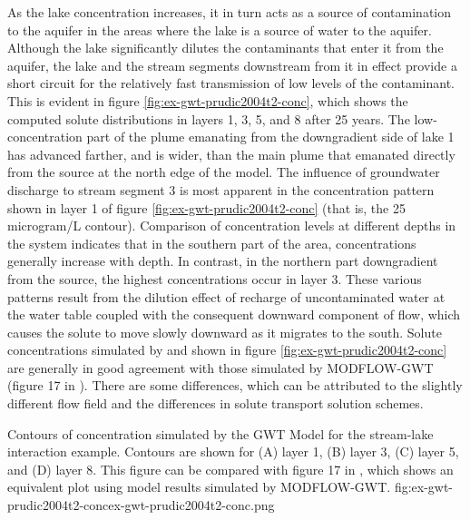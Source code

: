 As the lake concentration increases, it in turn acts as a source of contamination to the aquifer in the areas where the lake is a source of water to the aquifer. Although the lake significantly dilutes the contaminants that enter it from the aquifer, the lake and the stream segments downstream from it in effect provide a short circuit for the relatively fast transmission of low levels of the contaminant. This is evident in figure \ref{fig:ex-gwt-prudic2004t2-conc}, which shows the computed solute distributions in layers 1, 3, 5, and 8 after 25 years. The low-concentration part of the plume emanating from the downgradient side of lake 1 has advanced farther, and is wider, than the main plume that emanated directly from the source at the north edge of the model. The influence of groundwater discharge to stream segment 3 is most apparent in the concentration pattern shown in layer 1 of figure \ref{fig:ex-gwt-prudic2004t2-conc} (that is, the 25 microgram/L contour). Comparison of concentration levels at different depths in the system indicates that in the southern part of the area, concentrations generally increase with depth. In contrast, in the northern part downgradient from the source, the highest concentrations occur in layer 3. These various patterns result from the dilution effect of recharge of uncontaminated water at the water table coupled with the consequent downward component of flow, which causes the solute to move slowly downward as it migrates to the south.  Solute concentrations simulated by \mf and shown in figure \ref{fig:ex-gwt-prudic2004t2-conc} are generally in good agreement with those simulated by MODFLOW-GWT (figure 17 in \cite{modflowsfr1pack}).  There are some differences, which can be attributed to the slightly different flow field and the differences in solute transport solution schemes.

\begin{StandardFigure}{
                                     Contours of concentration simulated by the \mf GWT Model for the stream-lake interaction example.  Contours are shown for (A) layer 1, (B) layer 3, (C) layer 5, and (D) layer 8. This figure can be compared with figure 17 in \cite{modflowsfr1pack}, which shows an equivalent plot using model results simulated by MODFLOW-GWT.
                                     }{fig:ex-gwt-prudic2004t2-conc}{ex-gwt-prudic2004t2-conc.png}
\end{StandardFigure}            

